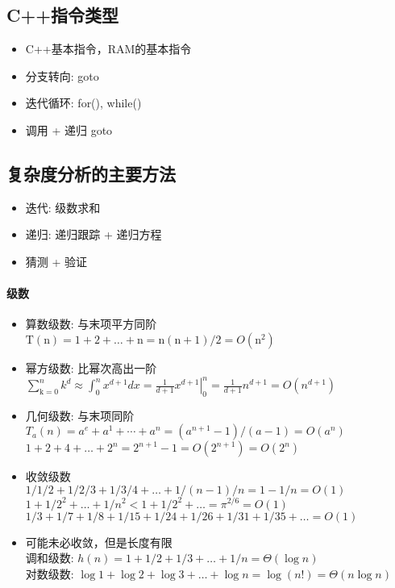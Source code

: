 \subsection{C++指令类型}
\begin{itemize}
\item C++基本指令，RAM的基本指令
\item 分支转向: goto
\item 迭代循环: for(), while()
\item 调用 + 递归 \ra goto
\end{itemize}

\subsection{复杂度分析的主要方法}
\begin{itemize}
\item 迭代: 级数求和
\item 递归: 递归跟踪 + 递归方程
\item 猜测 + 验证
\end{itemize}

\paragraph{级数}
\begin{itemize}
\item 算数级数: 与末项平方同阶 \\ $\mathrm{T}(\mathrm{n})=1+2+\ldots+\mathrm{n}=\mathrm{n}(\mathrm{n}+1) / 2=O\left(\mathrm{n}^{2}\right)$
\item 幂方级数: 比幂次高出一阶 \\ $\sum_{\mathrm{k}=0}^{n} k^{d} \approx \int_{0}^{n} x^{d+1} d x=\left.\frac{1}{d+1} x^{d+1}\right|_{0} ^{n}=\frac{1}{d+1} n^{d+1}=O\left(n^{d+1}\right)$
\item 几何级数: 与末项同阶 \\ $T_{a}(n)=a^{e}+a^{1}+\cdots+a^{n}=\left(a^{n+1}-1\right) /(a-1) = O\left(a^{n}\right)$\\
$1+2+4+\ldots+2^{n}=2^{n+1}-1=O\left(2^{n+1}\right)=O\left(2^{n}\right)$
\item 收敛级数 \\$1 / 1 / 2+1 / 2 / 3+1 / 3 / 4+\ldots+1 /(n-1) / n=1-1 / n=O(1)$\\
$1+1 / 2^{2}+\ldots+1 / n^{2}<1+1 / 2^{2}+\ldots=\pi^{2 / 6}=O(1)$\\
$1 / 3+1 / 7+1 / 8+1 / 15+1 / 24+1 / 26+1 / 31+1 / 35+\ldots=O(1)$
\item 可能未必收敛，但是长度有限\\
调和级数: $h(n)=1+1 / 2+1 / 3+\ldots+1 / n=\Theta(\log n)$ \\ 
对数级数: $\log 1+\log 2+\log 3+\ldots+\log  n=\log (n !)=\Theta(n \log n)$
\end{itemize}

